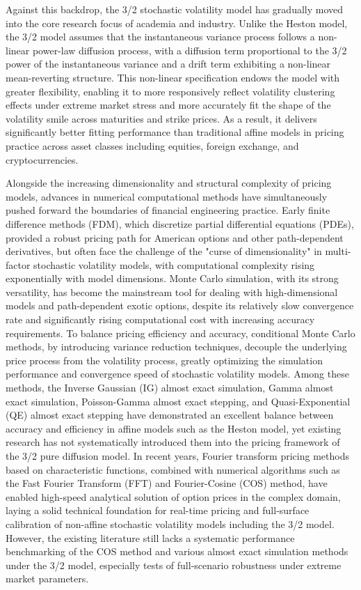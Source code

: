 Against this backdrop, the 3/2 stochastic volatility model has gradually moved into the core research focus of academia and industry. Unlike the Heston model, the 3/2 model assumes that the instantaneous variance process follows a non-linear power-law diffusion process, with a diffusion term proportional to the 3/2 power of the instantaneous variance and a drift term exhibiting a non-linear mean-reverting structure. This non-linear specification endows the model with greater flexibility, enabling it to more responsively reflect volatility clustering effects under extreme market stress and more accurately fit the shape of the volatility smile across maturities and strike prices. As a result, it delivers significantly better fitting performance than traditional affine models in pricing practice across asset classes including equities, foreign exchange, and cryptocurrencies.

Alongside the increasing dimensionality and structural complexity of pricing models, advances in numerical computational methods have simultaneously pushed forward the boundaries of financial engineering practice. Early finite difference methods (FDM), which discretize partial differential equations (PDEs), provided a robust pricing path for American options and other path-dependent derivatives, but often face the challenge of the "curse of dimensionality" in multi-factor stochastic volatility models, with computational complexity rising exponentially with model dimensions. Monte Carlo simulation, with its strong versatility, has become the mainstream tool for dealing with high-dimensional models and path-dependent exotic options, despite its relatively slow convergence rate and significantly rising computational cost with increasing accuracy requirements. To balance pricing efficiency and accuracy, conditional Monte Carlo methods, by introducing variance reduction techniques, decouple the underlying price process from the volatility process, greatly optimizing the simulation performance and convergence speed of stochastic volatility models. Among these methods, the Inverse Gaussian (IG) almost exact simulation, Gamma almost exact simulation, Poisson-Gamma almost exact stepping, and Quasi-Exponential (QE) almost exact stepping have demonstrated an excellent balance between accuracy and efficiency in affine models such as the Heston model, yet existing research has not systematically introduced them into the pricing framework of the 3/2 pure diffusion model. In recent years, Fourier transform pricing methods based on characteristic functions, combined with numerical algorithms such as the Fast Fourier Transform (FFT) and Fourier-Cosine (COS) method, have enabled high-speed analytical solution of option prices in the complex domain, laying a solid technical foundation for real-time pricing and full-surface calibration of non-affine stochastic volatility models including the 3/2 model. However, the existing literature still lacks a systematic performance benchmarking of the COS method and various almost exact simulation methods under the 3/2 model, especially tests of full-scenario robustness under extreme market parameters.

